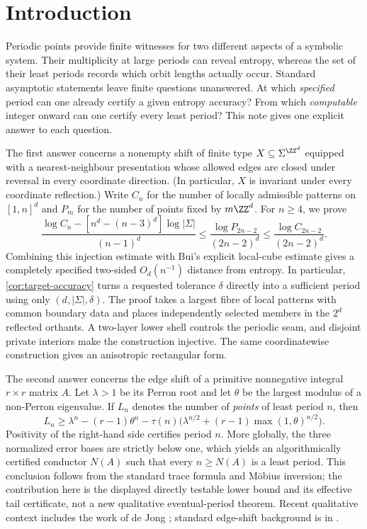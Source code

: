 \section{Introduction}
\label{sec:introduction}

Periodic points provide finite witnesses for two different aspects of a
symbolic system.  Their multiplicity at large periods can reveal entropy,
whereas the set of their least periods records which orbit lengths actually
occur.  Standard asymptotic statements leave finite questions unanswered.
At which \emph{specified} period can one already certify a given entropy
accuracy?  From which \emph{computable} integer onward can one certify every
least period?  This note gives one explicit answer to each question.

The first answer concerns a nonempty shift of finite type
$X\subseteq\Sigma^{\ZZ^d}$ equipped with a nearest-neighbour presentation
whose allowed edges are closed under reversal in every coordinate direction.
(In particular, $X$ is invariant under every coordinate reflection.)
Write $C_n$ for the number of locally admissible patterns on $[1,n]^d$ and
$P_m$ for the number of points fixed by $m\ZZ^d$.  For $n\ge4$, we prove
\begin{equation}
\frac{\log C_n-[n^d-(n-3)^d]\log|\Sigma|}{(n-1)^d}
\le \frac{\log P_{2n-2}}{(2n-2)^d}
\le \frac{\log C_{2n-2}}{(2n-2)^d}.
\label{eq:intro-sandwich}
\end{equation}
Combining this injection estimate with Bui's explicit local-cube estimate
\cite{Bui2026} gives a completely specified two-sided $O_d(n^{-1})$
distance from entropy.  In particular, \cref{cor:target-accuracy} turns a
requested tolerance $\delta$ directly into a sufficient period using only
$(d,|\Sigma|,\delta)$.  The proof takes a largest fibre of local patterns
with common boundary data and places independently selected members in the
$2^d$ reflected orthants.  A two-layer lower shell controls the periodic
seam, and disjoint private interiors make the construction injective.  The
same coordinatewise construction gives an anisotropic rectangular form.

The second answer concerns the edge shift of a primitive nonnegative integral
$r\times r$ matrix $A$.  Let $\lambda>1$ be its Perron root and let $\theta$
be the largest modulus of a non-Perron eigenvalue.  If $L_n$ denotes the
number of \emph{points} of least period $n$, then
\begin{equation}
L_n\ge \lambda^n-(r-1)\theta^n
-\tau(n)\bigl(\lambda^{n/2}
 +(r-1)\max(1,\theta)^{n/2}\bigr).
\label{eq:intro-least}
\end{equation}
Positivity of the right-hand side certifies period $n$.  More globally, the
three normalized error bases are strictly below one, which yields an
algorithmically certified conductor $N(A)$ such that every $n\ge N(A)$ is a
least period.  This conclusion follows from the standard trace formula and
M\"obius inversion; the contribution here is the displayed directly testable
lower bound and its effective tail certificate, not a new qualitative
eventual-period theorem.  Recent qualitative context includes the work of de
Jong \cite{deJong2025}; standard edge-shift background is in
\cite{LindMarcus2021}.

